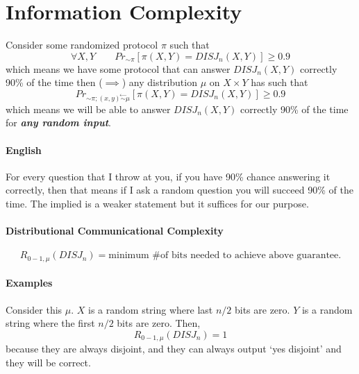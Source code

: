 \section{Information Complexity}
\begin{definition}
	Consider some randomized protocol $\pi$ such that 
	\begin{equation}
		\forall X, Y\quad \quad Pr_{\sim \pi}[\pi(X, Y) = DISJ_n(X, Y)] \geq 0.9
	\end{equation}
	which means we have some protocol that can answer $DISJ_n(X, Y)$ correctly 90\% of the time then ($\implies$) any distribution $\mu$ on $X\times Y$ has such that
	\begin{equation}
		Pr_{\sim \pi; (x, y) \overset{\gets}{\sim} \mu} [\pi(X, Y) = DISJ_n(X, Y)] \geq 0.9
	\end{equation}
	which means we will be able to answer $DISJ_n(X,Y)$ correctly 90\% of the time for \textit{\textbf{any random input}}.  
	
	\paragraph{English} For every question that I throw at you, if you have 90\% chance answering it correctly, then that means if I ask a random question you will succeed 90\% of the time. The implied is a weaker statement but it suffices for our purpose. 
	
	\paragraph{Distributional Communicational Complexity} 
	\begin{equation}
		R_{0-1, \mu}(DISJ_n) = \text{minimum \# of bits needed to achieve above guarantee}. 
	\end{equation}
\end{definition}

\paragraph{Examples}
Consider this $\mu$. $X$ is a random string where last $n/2$ bits are zero. $Y$ is a random string where the first $n/2$ bits are zero. Then, 
\begin{equation}
	R_{0-1,\mu}(DISJ_n) = 1
\end{equation}
because they are always disjoint, and they can always output `yes disjoint' and they will be correct. 

